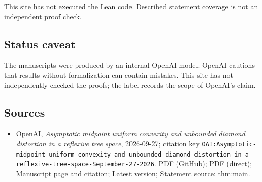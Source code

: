 \documentclass[11pt]{article}
\begin{document}
This site has not executed the Lean code. Described statement coverage is not an independent proof check.

\subsection{Status caveat}
The manuscripts were produced by an internal OpenAI model. OpenAI cautions that results without formalization can contain mistakes. This site has not independently checked the proofs; the label records the scope of OpenAI's claim.

\subsection{Sources}
\begin{itemize}
\item OpenAI, \emph{Asymptotic midpoint uniform convexity and unbounded diamond distortion in a reflexive tree space}, 2026-09-27; citation key \texttt{OAI:Asymptotic-midpoint-uniform-convexity-and-unbounded-diamond-distortion-in-a-reflexive-tree-space-September-27-2026}. \href{https://github.com/openai/math/blob/adc7f1241b42e322a6451854ab7e4b4c146bf78a/preprints/Asymptotic-midpoint-uniform-convexity-and-unbounded-diamond-distortion-in-a-reflexive-tree-space-September-27-2026/manuscript.pdf}{PDF (GitHub)}; \href{https://github.com/openai/math/raw/adc7f1241b42e322a6451854ab7e4b4c146bf78a/preprints/Asymptotic-midpoint-uniform-convexity-and-unbounded-diamond-distortion-in-a-reflexive-tree-space-September-27-2026/manuscript.pdf}{PDF (direct)}; \href{https://github.com/openai/math/blob/adc7f1241b42e322a6451854ab7e4b4c146bf78a/preprints/Asymptotic-midpoint-uniform-convexity-and-unbounded-diamond-distortion-in-a-reflexive-tree-space-September-27-2026/README.md}{Manuscript page and citation}; \href{https://github.com/openai/math/blob/main/preprints/Asymptotic-midpoint-uniform-convexity-and-unbounded-diamond-distortion-in-a-reflexive-tree-space-September-27-2026/manuscript.pdf}{Latest version}; Statement source: \href{https://github.com/openai/math/blob/adc7f1241b42e322a6451854ab7e4b4c146bf78a/preprints/Asymptotic-midpoint-uniform-convexity-and-unbounded-diamond-distortion-in-a-reflexive-tree-space-September-27-2026/build/sections/introduction.tex\#L99}{thm:main}.

\end{itemize}
\end{document}
